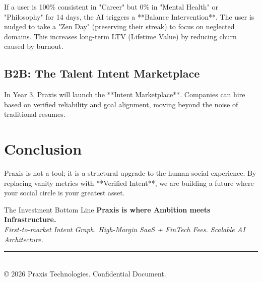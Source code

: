 \documentclass[11pt,a4paper,oneside]{article}
\begin{document}
\begin{statbox}
If a user is 100\% consistent in "Career" but 0\% in "Mental Health" or "Philosophy" for 14 days, the AI triggers a **Balance Intervention**. The user is nudged to take a "Zen Day" (preserving their streak) to focus on neglected domains. This increases long-term LTV (Lifetime Value) by reducing churn caused by burnout.
\end{statbox}

\subsection{B2B: The Talent Intent Marketplace}
In Year 3, Praxis will launch the **Intent Marketplace**. Companies can hire based on verified reliability and goal alignment, moving beyond the noise of traditional resumes.

\section{Conclusion}

Praxis is not a tool; it is a structural upgrade to the human social experience. By replacing vanity metrics with **Verified Intent**, we are building a future where your social circle is your greatest asset.

\bigskip
\begin{callout}[colback=praxisPurple!20, colframe=praxisPurple]{The Investment Bottom Line}
\centering
\Large
\textbf{Praxis is where Ambition meets Infrastructure.}\\[8pt]
\normalsize
\textit{First-to-market Intent Graph. High-Margin SaaS + FinTech Fees. Scalable AI Architecture.}
\end{callout}

\vfill
\begin{center}
\textcolor{praxisBlue}{\rule{8cm}{1.5pt}} \\
\small\textcolor{philGray}{© 2026 Praxis Technologies. Confidential Document.}
\end{center}
\end{document}
